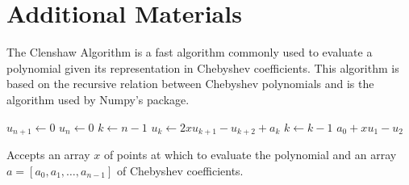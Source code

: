 \section*{Additional Materials}
The Clenshaw Algorithm is a fast algorithm commonly used to evaluate a polynomial given its representation in Chebyshev coefficients.
This algorithm is based on the recursive relation between Chebyshev polynomials and is the algorithm used by Numpy's  package.

\begin{algorithm}
\begin{algorithmic}[1]
	\State $u_{n+1} \gets 0$
	\State $u_{n} \gets 0$
	\State $k \gets n-1$
		\State $u_k \gets 2 x u_{k+1} - u_{k+2} + a_k$
		\State $k \gets k-1$
	\EndWhile
	\State {} $a_0 + x u_1 -u_2$
\EndProcedure
\end{algorithmic}
\caption{Accepts an array $x$ of points at which to evaluate the polynomial and an array $a=[a_0,a_1,\dots,a_{n-1}]$ of Chebyshev coefficients.}
\label{alg:clenshaw_recursion}
\end{algorithm}




